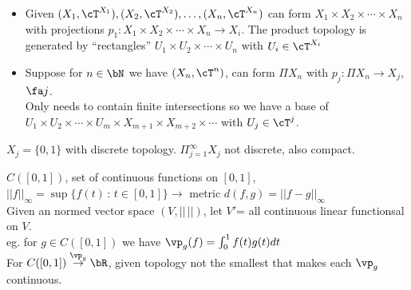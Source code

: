 \begin{itemize}
    \item Given $(X_1, \cT^{X_1}), (X_2, \cT^{X_2}), \ldots, (X_n, \cT^{X_n})$ can form $X_1 \times X_2 \times \cdots \times X_n$ with projections $p_1 : X_1 \times X_2 \times \cdots \times X_n \to X_i$. The product topology is generated by ``rectangles'' $U_1 \times U_2 \times \cdots \times U_n$ with $U_i \in \cT^{X_i}$ 
    \item Suppose for $n \in \bN$ we have $(X_n, \cT^n)$, can form $\Pi X_n$ with $p_j: \Pi X_n \to X_j$, $\fa j$. \\
    Only needs to contain finite intersections so we have a base of $U_1 \times U_2 \times \cdots \times U_m \times X_{m+1} \times X_{m+2} \times \cdots $ with $U_j \in \cT^j$. 
\end{itemize}

\begin{example}
    $X_j = \{0,1\}$ with discrete topology. $\Pi_{j=1}^{\infty} X_j$ not discrete, also compact. 
\end{example}

\begin{example}
    $C([0,1])$, set of continuous functions on $[0,1]$, $||f||_{\infty} = \sup \{f(t) \, : \, t \in [0,1]\} \to $ metric $d(f,g) = ||f-g||_{\infty}$ \\
    Given an normed vector space $(V, || \, ||)$, let $V'$= all continuous linear functionsal on $V$. \\
    eg. for $g \in C([0, 1])$ we have $\vp_g(f) = \int_0^1 f(t)g(t)dt$\\
    For $C([0,1]) \stackrel{\vp_g}{\to} \bR$, given topology not the smallest that makes each $\vp_g$ continuous. 
\end{example}